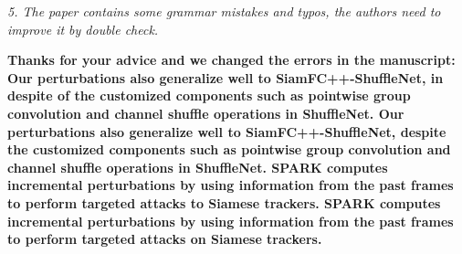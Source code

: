 \documentclass[12pt]{article}
\begin{document}
\textit{5. The paper contains some grammar mistakes and typos, the authors need to improve it by double check.}

\textbf{
Thanks for your advice and we changed the errors in the manuscript:
Our perturbations also generalize well to SiamFC++-ShuffleNet, in despite of the customized components such as pointwise group convolution and channel shuffle operations in ShuffleNet.
Our perturbations also generalize well to SiamFC++-ShuffleNet, despite the customized components such as pointwise group convolution and channel shuffle operations in ShuffleNet.
SPARK computes incremental perturbations by using information from the past frames to perform targeted attacks to Siamese trackers.
SPARK computes incremental perturbations by using information from the past frames to perform targeted attacks on Siamese trackers.}



\end{document}
